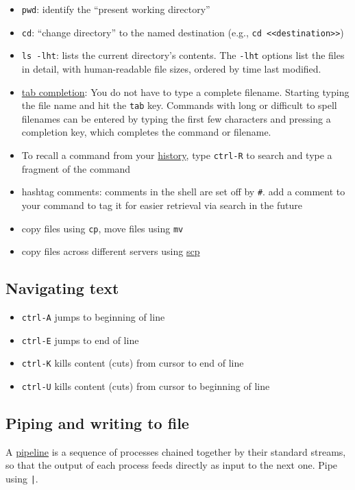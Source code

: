 \begin{itemize}
	\item \texttt{pwd}: identify the ``present working directory''
	\item \texttt{cd}: ``change directory'' to the named destination (e.g., \texttt{cd <<destination>>})
	\item \texttt{ls -lht}: lists the current directory's contents. The \texttt{-lht} options list the files in detail, with human-readable file sizes, ordered by time last modified.
	\item \href{https://en.wikipedia.org/wiki/Command-line_completion}{tab completion}: You do not have to type a complete filename. Starting typing the file name and hit the \texttt{tab} key. Commands with long or difficult to spell filenames can be entered by typing the first few characters and pressing a completion key, which completes the command or filename.
	\item To recall a command from your \href{https://www.howtogeek.com/howto/44997/how-to-use-bash-history-to-improve-your-command-line-productivity/}{history}, type \texttt{ctrl-R} to search and type a fragment of the command
	\item hashtag comments: comments in the shell are set off by \texttt{\#}. add a comment to your command to tag it for easier retrieval via search in the future
	\item copy files using \texttt{cp}, move files using \texttt{mv}
	\item copy files across different servers using \href{https://kb.iu.edu/d/agye}{scp}
\end{itemize}

\subsection{Navigating text}

\begin{itemize}
	\item \texttt{ctrl-A} jumps to beginning of line
	\item \texttt{ctrl-E} jumps to end of line
	\item \texttt{ctrl-K} kills content (cuts) from cursor to end of line
	\item \texttt{ctrl-U} kills content (cuts) from cursor to beginning of line
\end{itemize}

\subsection{Piping and writing to file}
A \href{https://en.wikipedia.org/wiki/Pipeline_(Unix)}{pipeline} is a sequence of processes chained together by their standard streams, so that the output of each process feeds directly as input to the next one.
Pipe using \texttt{|}.

